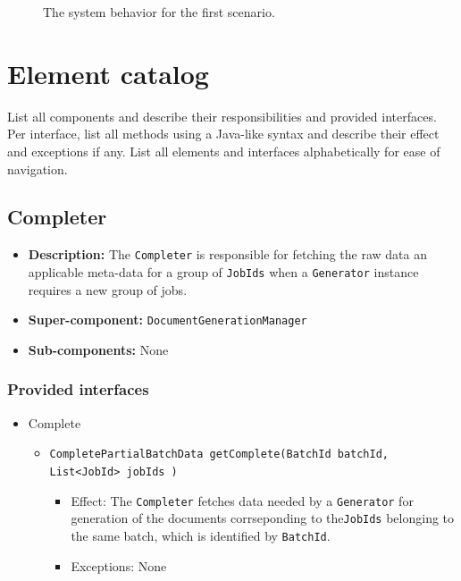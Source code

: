 \documentclass[a4paper,10pt]{article}
\begin{document}
\begin{figure}[!htp]
    \centering
    \caption{The system behavior for the first scenario.
        }\label{fig:seq_scenario1}
\end{figure}

\appendix
\section{Element catalog}\label{app:catalog}
List all components and describe their responsibilities and provided
interfaces.
Per interface, list all methods using a Java-like syntax and describe their
effect and exceptions if any.
List all elements and interfaces alphabetically for ease of navigation.

\subsection{Completer}
\begin{itemize}
    \item \textbf{Description:} The \texttt{Completer} is responsible for fetching the raw data an applicable meta-data for a group of \texttt{JobIds} when a \texttt{Generator} instance requires a new group of jobs.
    \item \textbf{Super-component:} \texttt{DocumentGenerationManager}
    \item \textbf{Sub-components:} None
\end{itemize}

\subsubsection*{Provided interfaces}
\begin{itemize}
    \item Complete
    \begin{itemize}
        \item \texttt{CompletePartialBatchData getComplete(BatchId batchId, List<JobId> jobIds )}
        \begin{itemize}
            \item Effect: The \texttt{Completer} fetches data needed by a \texttt{Generator} for generation of the documents corrseponding to the\texttt{JobIds} belonging to the same batch, which is identified by \texttt{BatchId}.
            \item Exceptions: None
        \end{itemize}
    \end{itemize}
\end{itemize}
\end{document}
